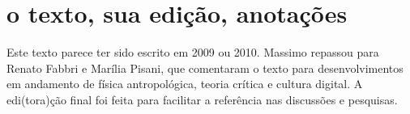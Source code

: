 \documentclass[a4paper, 11pt]{article} %
\begin{document}
\section*{o texto, sua edição, anotações}\label{sec:pal}
Este texto parece ter sido escrito em 2009 ou 2010. Massimo repassou para Renato Fabbri e Marília Pisani,
 que comentaram o texto para desenvolvimentos em andamento de física antropológica, teoria crítica e cultura digital.
A edi(tora)ção final foi feita para facilitar a referência nas discussões e pesquisas.



%
%


\end{document}
